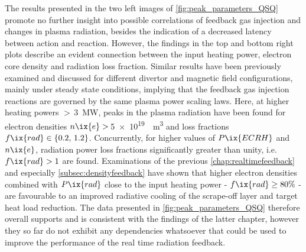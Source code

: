         The results presented in the two left images of \cref{fig:peak_parameters_QSQ} promote no further insight into possible correlations of feedback gas injection and changes in plasma radiation, besides the indication of a decreased latency between action and reaction. However, the findings in the top and bottom right plots describe an evident connection between the input heating power, electron core density and radiation loss fraction. Similar results have been previously examined and discussed for different divertor and magnetic field configurations, mainly under steady state conditions\cite{Klinger2016,Fuchert2018,Zhang2020}, implying that the feedback gas injection reactions are governed by the same plasma power scaling laws. Here, at higher heating powers $>\,$\SI{3}{\mega\watt}, peaks in the plasma radiation have been found for electron densities $n\ix{e}>\,$\SI{5e19}{\per\cubic\meter} and loss fractions $f\ix{rad}\in\left\{0.2,\,1.2\right\}$. Concurrently, for higher values of $P\ix{ECRH}$ and $n\ix{e}$, radiation power loss fractions significantly greater than unity, i.e. $f\ix{rad}>1$ are found. Examinations of the previous \cref{chap:realtimefeedback} and especially \cref{subsec:densityfeedback} have shown that higher electron densities combined with $P\ix{rad}$ close to the input heating power - $f\ix{rad}\ge80\%$ - are favourable to an improved radiative cooling of the scrape-off layer and target heat load reduction. The data presented in \cref{fig:peak_parameters_QSQ} therefore overall supports and is consistent with the findings of the latter chapter, however they so far do not exhibit any dependencies whatsoever that could be used to improve the performance of the real time radiation feedback.%
%
